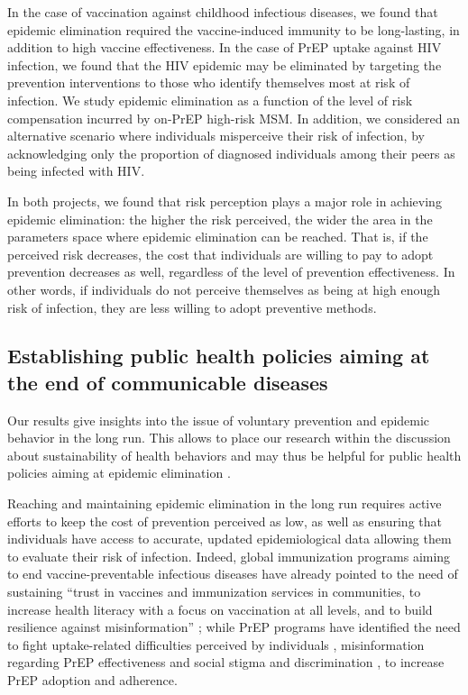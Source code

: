 In the case of vaccination against childhood infectious diseases, we found that epidemic elimination required the vaccine-induced immunity to be long-lasting, in addition to high vaccine effectiveness. In the case of PrEP uptake against HIV infection, we found that the HIV epidemic may be eliminated by targeting the prevention interventions to those who identify themselves most at risk of infection. We study epidemic elimination as a function of the level of risk compensation incurred by on-PrEP high-risk MSM. In addition, we considered an alternative scenario where individuals misperceive their risk of infection, by acknowledging only the proportion of diagnosed individuals among their peers as being infected with HIV.

In both projects, we found that risk perception plays a major role in achieving epidemic elimination: the higher the risk perceived, the wider the area in the parameters space where epidemic elimination can be reached. That is, if the perceived risk decreases, the cost that individuals are willing to pay to adopt prevention decreases as well, regardless of the level of prevention effectiveness. In other words, if individuals do not perceive themselves as being at high enough risk of infection, they are less willing to adopt preventive methods. 

\subsection{Establishing public health policies aiming at the end of communicable diseases}

Our results give insights into the issue of voluntary prevention and epidemic behavior in the long run. This allows to place our research within the discussion about sustainability of health behaviors and may thus be helpful for public health policies aiming at epidemic elimination \cite[]{SDG_Goal3}.  

Reaching and maintaining epidemic elimination in the long run requires active efforts to keep the cost of prevention perceived as low, as well as ensuring that individuals have access to accurate, updated epidemiological data allowing them to evaluate their risk of infection. Indeed, global immunization programs aiming to end vaccine-preventable infectious diseases have already pointed to the need of sustaining ``trust in vaccines and immunization services in communities, to increase health literacy with a focus on vaccination at all levels, and to build resilience against misinformation'' \cite[]{WHO_IA2030}; while PrEP programs have identified the need to fight uptake-related difficulties perceived by individuals \cite[]{Desai2018,Sidebottom2018}, misinformation regarding PrEP effectiveness \cite[]{Young2014,Underhill2016} and social stigma and discrimination \cite[]{Young2014,PerezFigueroa2015,Arnold2016}, to increase PrEP adoption and adherence.

